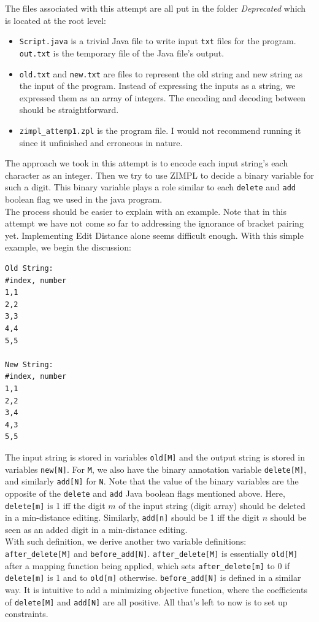 \documentclass{article}
\begin{document}
The files associated with this attempt are all put in the folder \textit{Deprecated} which is located at the root level:
\begin{itemize}
  \item \texttt{Script.java} is a trivial Java file to write input \texttt{txt} files for the program. \texttt{out.txt} is the temporary file of the Java file's output.
  \item \texttt{old.txt} and \texttt{new.txt} are files to represent the old string and new string as the input of the program. Instead of expressing the inputs as a string, we expressed them as an array of integers. The encoding and decoding between should be straightforward.
  \item \texttt{zimpl\_attemp1.zpl} is the program file. I would not recommend running it since it unfinished and erroneous in nature. 
\end{itemize}

The approach we took in this attempt is to encode each input string's each character as an integer. Then we try to use ZIMPL to decide a binary variable for such a digit. This binary variable plays a role similar to each \texttt{delete} and \texttt{add} boolean flag we used in the java program. \\

The process should be easier to explain with an example. Note that in this attempt we have not come so far to addressing the ignorance of bracket pairing yet. Implementing Edit Distance alone seems difficult enough. With this simple example, we begin the discussion:
\begin{lstlisting}
Old String:
#index, number
1,1
2,2
3,3
4,4
5,5

New String:
#index, number
1,1
2,2
3,4
4,3
5,5
\end{lstlisting}
The input string is stored in variables \texttt{old[M]} and the output string is stored in variables \texttt{new[N]}. For \texttt{M}, we also have the binary annotation variable \texttt{delete[M]}, and similarly \texttt{add[N]} for \texttt{N}. Note that the value of the binary variables are the opposite of the \texttt{delete} and \texttt{add} Java boolean flags mentioned above. Here, \texttt{delete[m]} is 1 iff the digit $m$ of the input string (digit array) should be deleted in a min-distance editing. Similarly, \texttt{add[n]} should be 1 iff the digit $n$ should be seen as an added digit in a min-distance editing. \\

With such definition, we derive another two variable definitions: \texttt{after\_delete[M]} and \texttt{before\_add[N]}.  \texttt{after\_delete[M]} is essentially \texttt{old[M]} after a mapping function being applied, which sets \texttt{after\_delete[m]} to 0 if \texttt{delete[m]} is 1 and to \texttt{old[m]} otherwise. \texttt{before\_add[N]} is defined in a similar way. It is intuitive to add a minimizing objective function, where the coefficients of \texttt{delete[M]} and \texttt{add[N]} are all positive. All that's left to now is to set up constraints. \\
\end{document}
